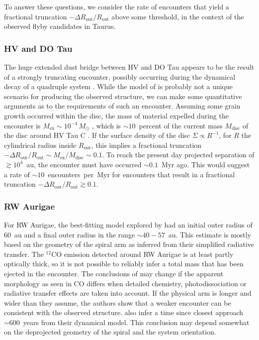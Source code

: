 \documentclass{aa}
\begin{document}
To answer these questions, we consider the rate of encounters that yield a fractional truncation $-\Delta R_\mathrm{out}/R_\mathrm{out}$ above some threshold, in the context of the observed flyby candidates in Taurus. 

\subsubsection{HV and DO Tau}

The huge extended dust bridge between HV and DO Tau \citep{Howard13} appears to be the result of a strongly truncating encounter, possibly occurring during the dynamical decay of a quadruple system \citep{Winter18c}. While the model of \citet{Winter18c} is probably not a unique scenario for producing the observed structure, we can make some quantitative arguments as to the requirements of such an encounter. Assuming some grain growth occurred within the disc, the mass of material expelled during the encounter is $M_\mathrm{ex} \sim 10^{-4} \, M_\odot$ \citep{Winter18c}, which is $\sim 10$~percent of the current mass $M_\mathrm{disc}$ of the disc around HV Tau C \citep{Stapelfeldt03}. If the surface density of the disc $\Sigma \propto R^{-1}$, for $R$ the cylindrical radius inside $R_\mathrm{out}$, this implies a fractional truncation $-\Delta R_\mathrm{out}/R_\mathrm{out}\sim M_\mathrm{ex}/M_\mathrm{disc} \sim 0.1$. To reach the present day projected separation of $\gtrsim 10^4$~au, the encounter must have occurred $\sim 0.1$~Myr ago. This would suggest a rate of $\sim 10$~encounters~per~Myr for encounters that result in a fractional truncation $-\Delta R_\mathrm{out}/R_\mathrm{out} \gtrsim 0.1$. 

\subsubsection{RW Aurigae}

For RW Aurigae, the best-fitting model explored by \citet{Dai15} had an initial outer radius of $60$~au and a final outer radius in the range $\sim 40-57$~au. This estimate is mostly based on the geometry of the spiral arm as inferred from their simplified radiative transfer. The $^{12}$CO emission detected around RW Aurigae is at least partly optically thick, so it is not possible to reliably infer a total mass that has been ejected in the encounter. The conclusions of \cite{Dai15} may change if the apparent morphology as seen in CO differs when detailed chemistry, photodissociation or radiative transfer effects are taken into account. If the physical arm is longer and wider than they assume, the authors show that a weaker encounter can be consistent with the observed structure. \citet{Dai15} also infer a time since closest approach $\sim 600$~years from their dynamical model. This conclusion may depend somewhat on the deprojected geometry of the spiral and the system orientation. 
\end{document}

